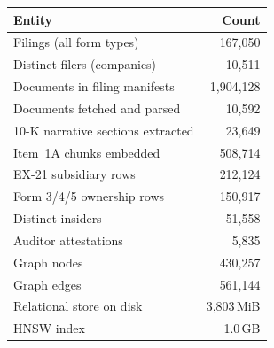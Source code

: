 \begin{tabular}{@{}lr@{}}
\toprule
\textbf{Entity} & \textbf{Count} \\
\midrule
Filings (all form types)          & 167,050 \\
Distinct filers (companies)       & 10,511 \\
Documents in filing manifests     & 1,904,128 \\
Documents fetched and parsed      & 10,592 \\
10-K narrative sections extracted & 23,649 \\
Item~1A chunks embedded           & 508,714 \\
EX-21 subsidiary rows             & 212,124 \\
Form 3/4/5 ownership rows         & 150,917 \\
Distinct insiders                 & 51,558 \\
Auditor attestations              & 5,835 \\
\midrule
Graph nodes                       & 430,257 \\
Graph edges                       & 561,144 \\
\midrule
Relational store on disk          & 3,803\,MiB \\
HNSW index                        & 1.0\,GB \\
\bottomrule
\end{tabular}
